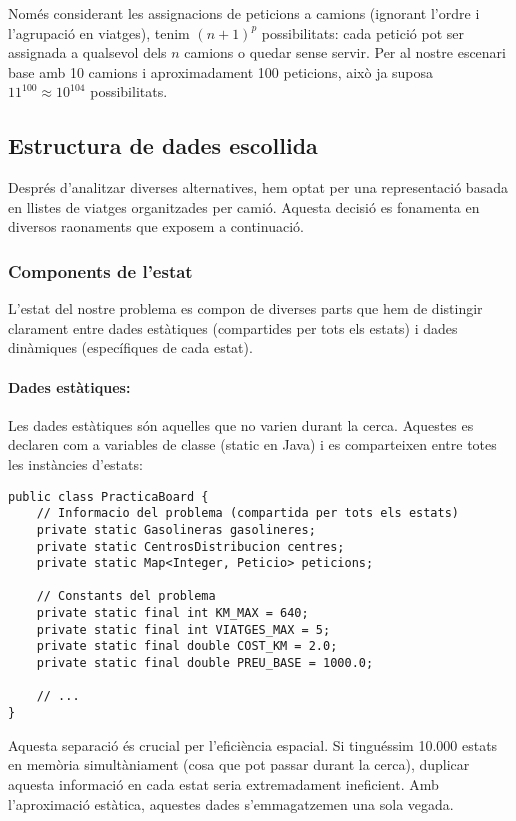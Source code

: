 Només considerant les assignacions de peticions a camions (ignorant l'ordre i l'agrupació en viatges), tenim $(n+1)^p$ possibilitats: cada petició pot ser assignada a qualsevol dels $n$ camions o quedar sense servir. Per al nostre escenari base amb 10 camions i aproximadament 100 peticions, això ja suposa $11^{100} \approx 10^{104}$ possibilitats.

\subsection{Estructura de dades escollida}

Després d'analitzar diverses alternatives, hem optat per una representació basada en llistes de viatges organitzades per camió. Aquesta decisió es fonamenta en diversos raonaments que exposem a continuació.

\subsubsection{Components de l'estat}

L'estat del nostre problema es compon de diverses parts que hem de distingir clarament entre dades estàtiques (compartides per tots els estats) i dades dinàmiques (específiques de cada estat).

\paragraph{Dades estàtiques:}

Les dades estàtiques són aquelles que no varien durant la cerca. Aquestes es declaren com a variables de classe (static en Java) i es comparteixen entre totes les instàncies d'estats:

\begin{lstlisting}[caption={Dades estàtiques de l'estat}, label={lst:static-data}]
public class PracticaBoard {
    // Informacio del problema (compartida per tots els estats)
    private static Gasolineras gasolineres;
    private static CentrosDistribucion centres;
    private static Map<Integer, Peticio> peticions;
    
    // Constants del problema
    private static final int KM_MAX = 640;
    private static final int VIATGES_MAX = 5;
    private static final double COST_KM = 2.0;
    private static final double PREU_BASE = 1000.0;
    
    // ...
}
\end{lstlisting}

Aquesta separació és crucial per l'eficiència espacial. Si tinguéssim 10.000 estats en memòria simultàniament (cosa que pot passar durant la cerca), duplicar aquesta informació en cada estat seria extremadament ineficient. Amb l'aproximació estàtica, aquestes dades s'emmagatzemen una sola vegada.

